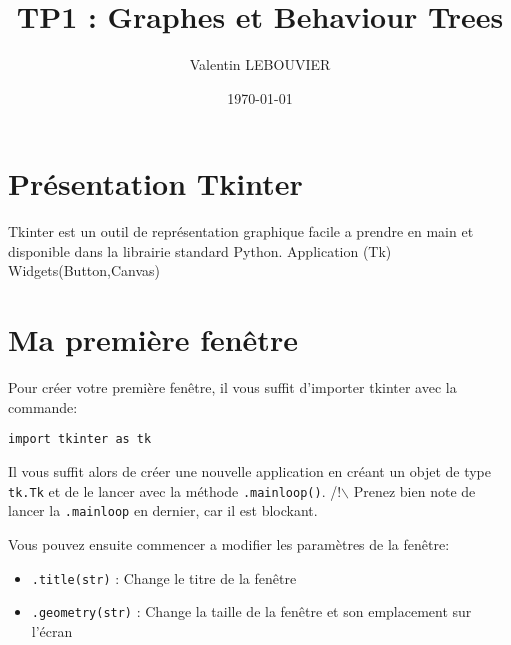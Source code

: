 \documentclass{article}
\author{Valentin LEBOUVIER}
\date{\today}
\title{TP1 : Graphes et Behaviour Trees}
\begin{document}
\maketitle


\section{Présentation Tkinter}
\label{sec-1}
Tkinter est un outil de représentation graphique facile a prendre en main et disponible dans la librairie standard Python.
Application (Tk)
Widgets(Button,Canvas)


\section{Ma première fenêtre}
\label{sec-2}
Pour créer votre première fenêtre, il vous suffit d'importer tkinter avec la commande:

\begin{verbatim}
import tkinter as tk
\end{verbatim}

Il vous suffit alors de créer une nouvelle application en créant un objet de type \verb~tk.Tk~ et de le lancer avec la méthode \verb~.mainloop()~. /!$\backslash$ Prenez bien note de lancer la \verb~.mainloop~ en dernier, car il est blockant.

\noindent
Vous pouvez ensuite commencer a modifier les paramètres de la fenêtre:
\begin{itemize}
\item \verb~.title(str)~ : Change le titre de la fenêtre
\item \verb~.geometry(str)~ : Change la taille de la fenêtre et son emplacement sur l'écran
\end{itemize}
\end{document}
